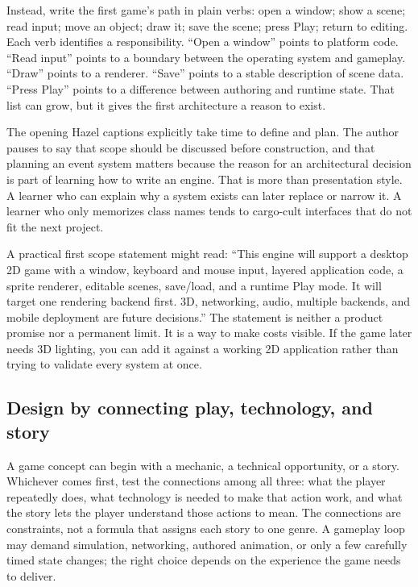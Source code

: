 Instead, write the first game's path in plain verbs: open a window; show a scene; read input; move an object; draw it; save the scene; press Play; return to editing. Each verb identifies a responsibility. ``Open a window'' points to platform code. ``Read input'' points to a boundary between the operating system and gameplay. ``Draw'' points to a renderer. ``Save'' points to a stable description of scene data. ``Press Play'' points to a difference between authoring and runtime state. That list can grow, but it gives the first architecture a reason to exist.

The opening Hazel captions explicitly take time to define and plan. The author pauses to say that scope should be discussed before construction, and that planning an event system matters because the reason for an architectural decision is part of learning how to write an engine. That is more than presentation style. A learner who can explain why a system exists can later replace or narrow it. A learner who only memorizes class names tends to cargo-cult interfaces that do not fit the next project.

A practical first scope statement might read: ``This engine will support a desktop 2D game with a window, keyboard and mouse input, layered application code, a sprite renderer, editable scenes, save/load, and a runtime Play mode. It will target one rendering backend first. 3D, networking, audio, multiple backends, and mobile deployment are future decisions.'' The statement is neither a product promise nor a permanent limit. It is a way to make costs visible. If the game later needs 3D lighting, you can add it against a working 2D application rather than trying to validate every system at once.

\subsection{Design by connecting play, technology, and story}\label{05-engine-i-ch009-design-by-connecting-play-technology-and-story}

A game concept can begin with a mechanic, a technical opportunity, or a story. Whichever comes first, test the connections among all three: what the player repeatedly does, what technology is needed to make that action work, and what the story lets the player understand those actions to mean. The connections are constraints, not a formula that assigns each story to one genre. A gameplay loop may demand simulation, networking, authored animation, or only a few carefully timed state changes; the right choice depends on the experience the game needs to deliver.

